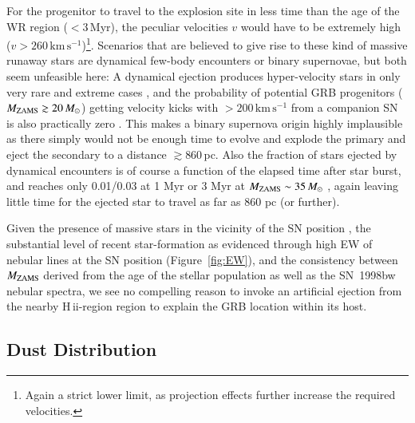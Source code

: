 \documentclass[traditabstract]{aa}
\newcommand{\hii}{\mbox{H\,{\sc ii}}}
\begin{document}
For the progenitor to travel to the explosion site in less time than the age of the WR region ($<3$\,Myr), the peculiar velocities $v$ would have to be extremely high ($v>260\,\mathrm{km\,s^{-1}}$)\footnote{Again a strict lower limit, as projection effects further increase the required velocities.}. Scenarios that are believed to give rise to these kind of massive runaway stars are dynamical few-body encounters or binary supernovae, but both seem unfeasible here: A dynamical ejection produces hyper-velocity stars in only very rare and extreme cases \citep{2001A&A...365...49H, 2012ApJ...751..133P}, and the probability of potential GRB progenitors ($M_{\rm{ZAMS}}\gtrsim 20\,M_\odot$) getting velocity kicks with $>200\,\mathrm{km\,s^{-1}}$ from a companion SN is also practically zero \citep{2011MNRAS.414.3501E}. This makes a binary supernova origin highly implausible as there simply would not be enough time to evolve and explode the primary and eject the secondary to a distance $\gtrsim860$\,pc. Also the fraction of stars ejected by dynamical encounters is of course a function of the elapsed time after star burst, and reaches only 0.01/0.03 at 1 Myr or 3 Myr at $M_{\rm{ZAMS}}\sim 35\,M_\odot$ \citep{2012ApJ...746...15B}, again leaving little time for the ejected star to travel as far as 860 pc (or further).

Given the presence of massive stars in the vicinity of the SN position \citep{2000ApJ...542L..89F}, the substantial level of recent star-formation as evidenced through high EW of nebular lines at the SN position (Figure~\ref{fig:EW}), and the consistency between $M_{\rm{ZAMS}}$ derived from the age of the stellar population as well as the SN~1998bw nebular spectra, we see no compelling reason to invoke an artificial ejection from the nearby \hii-region region to explain the GRB location within its host.

\subsection{Dust Distribution}
\end{document}
